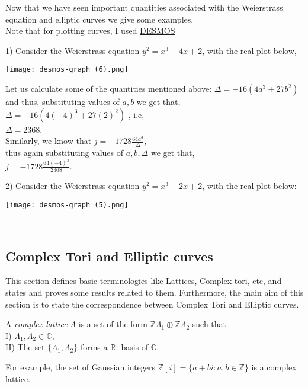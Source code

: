 Now that we have seen important quantities associated with the Weierstrass equation and elliptic curves we give some examples.\\
Note that for plotting curves, I used \href{https://www.desmos.com/}{DESMOS}
\begin{example}
  1)  Consider the Weierstrass equation $y^2=x^3-4x+2$, with the real plot below,
  \begin{center}
      \texttt{[image: desmos-graph (6).png]}
  \end{center}
    
Let us calculate some of the quantities mentioned above:
$\Delta=-16(4a^3+27b^2)$ and thus, substituting values of $a,b$ we get that, \\ 
$\Delta=-16(4(-4)^3+27(2)^2)$ , i.e, \\
$\Delta=2368$.\\Similarly, we know that 
$j=-1728 \frac{64a^3}{\Delta}$,\\
thus again substituting values of $a,b, \Delta$ we get that,\\
$j=-1728 \frac{64(-4)^3}{2368}$.




2)  Consider the Weierstrass equation $y^2=x^3-2x+2$, with the real plot below:
\begin{center}
     \texttt{[image: desmos-graph (5).png]}
\end{center}
 \end{example}  
\\
\subsection{Complex Tori and Elliptic curves}

This section defines basic terminologies like Lattices, Complex tori, etc, and states and proves some results related to them. Furthermore, the main aim of this section is to state the correspondence between Complex Tori and Elliptic curves. 
\begin{definition}
    A \textit{complex lattice} $\Lambda$ is a set of the form $\mathbb{Z}\Lambda_1 \oplus \mathbb{Z}\Lambda_2$ such that \\
    I) $\Lambda_1, \Lambda_2 \in \mathbb{C}$, \\
    II) The set $\{\Lambda_1, \Lambda_2\}$ forms a $\mathbb{R}$- basis of $\mathbb{C}$. 
\end{definition}
For example, the set of Gaussian integers $\mathbb{Z}[i]= \{a+bi : a, b \in \mathbb{Z} \}$ is a complex lattice. \\

